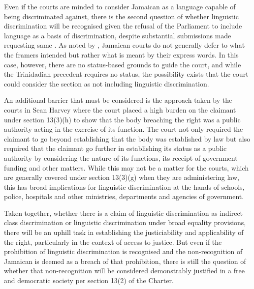\documentclass[output=paper,colorlinks,citecolor=brown]{langscibook}
\begin{document}
Even if the courts are minded to consider Jamaican as a language capable of being discriminated against, there is the second question of whether linguistic discrimination will be recognised given the refusal of the Parliament to include language as a basis of discrimination, despite substantial submissions made requesting same \citep{JointSelectCommittee_of_Parliament2002}. As noted by \citet{Wheatle2012}, Jamaican courts do not generally defer to what the framers intended but rather what is meant by their express words. In this case, however, there are no status-based grounds to guide the court, and while the Trinidadian precedent requires no status, the possibility exists that the court could consider the section as not including linguistic discrimination. 

An additional barrier that must be considered is the approach taken by the courts in Sean Harvey where the court placed a high burden on the claimant under section 13(3)(h) to show that the body breaching the right was a public authority acting in the exercise of its function. The court not only required the claimant to go beyond establishing that the body was established by law but also required that the claimant go further in establishing its status as a public authority by considering the nature of its functions, its receipt of government funding and other matters. While this may not be a matter for the courts, which are generally covered under section 13(3)(g) when they are administering law, this has broad implications for linguistic discrimination at the hands of schools, police, hospitals and other ministries, departments and agencies of government.

Taken together, whether there is a claim of linguistic discrimination as indirect class discrimination or linguistic discrimination under broad equality provisions, there will be an uphill task in establishing the justiciability and applicability of the right, particularly in the context of access to justice. But even if the prohibition of linguistic discrimination is recognised and the non-recognition of Jamaican is deemed as a breach of that prohibition, there is still the question of whether that non-recognition will be considered demonstrably justified in a free and democratic society per section 13(2) of the Charter. 
\end{document}
